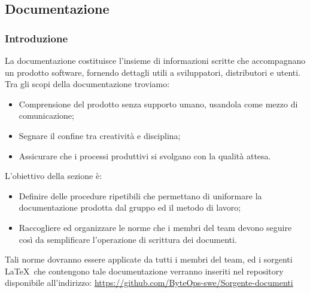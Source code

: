 \subsection{Documentazione}

\subsubsection{Introduzione}
La documentazione costituisce l'insieme di informazioni scritte che accompagnano un prodotto software, fornendo dettagli utili a sviluppatori, distributori e utenti.\\
Tra gli scopi della documentazione troviamo:
\begin{itemize}
    \item Comprensione del prodotto senza supporto umano, usandola come mezzo di comunicazione;
    \item Segnare il confine tra creatività e disciplina;
    \item Assicurare che i processi produttivi si svolgano con la qualità attesa.
\end{itemize}
L'obiettivo della sezione è:
\begin{itemize}
    \item  Definire delle procedure ripetibili che permettano di uniformare la documentazione prodotta dal gruppo ed il metodo di lavoro;
    \item  Raccogliere ed organizzare le norme che i membri del team devono seguire così da semplificare l'operazione di scrittura dei documenti.
\end{itemize}
Tali norme dovranno essere applicate da tutti i membri del team, ed i sorgenti \LaTeX\ che contengono tale documentazione verranno inseriti nel repository disponibile all'indirizzo:
\href{https://github.com/ByteOps-swe/Sorgente-documenti}{https://github.com/ByteOps-swe/Sorgente-documenti}

\begin{comment} \paragraph*{Primi approcci alla redazione di documenti e problematiche riscontrate}
Per la composizione iniziale dei documenti richiesti per la candidatura, è stato sperimentato un'approccio che impiegava gli strumenti di Google Drive. Tale metodologia consentiva ai redattori di redigere agevolmente i documenti senza la necessità di padroneggiare la sintassi LaTeX, con l'intenzione di trasporre successivamente il contenuto in LaTeX una volta che fosse stato validato dai verificatori. Tuttavia, questo approccio ha suscitato problematiche, tra cui:
\begin{itemize}
    \item Rischio di incoerenza tra il contenuto presente negli strumenti di Google Drive.
    \item Prolungato impiego di tempo per la riscrittura in LaTeX, dovuto alla necessità di un passaggio aggiuntivo.
\end{itemize}
Per tali ragioni si è presa la decisione di adottare un nuovo approccio.
\end{comment}
